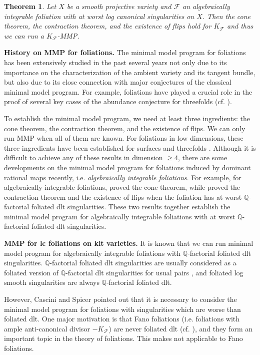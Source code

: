 \documentclass[11pt]{amsart}
\numberwithin{equation}{section}
\newcommand{\Qq}{\mathbb{Q}}
\newcommand{\Ff}{\mathcal{F}}
\newtheorem{thm}{Theorem}[section]
\theoremstyle{definition}
\theoremstyle{definition}
\theoremstyle{definition}
\begin{document}
\begin{thm}\label{thm: main theorem smooth projective}
    Let $X$ be a smooth projective variety and $\Ff$ an algebraically integrable foliation with at worst log canonical singularities on $X$. Then the cone theorem, the contraction theorem, and the existence of flips hold for $K_{\Ff}$ and thus we can run a $K_{\Ff}$-MMP.
\end{thm}

\noindent\textbf{History on MMP for foliations.} The minimal model program for foliations has been extensively studied in the past several years not only due to its importance on the characterization of the ambient variety and its tangent bundle, but also due to its close connection with major conjectures of the classical minimal model program. For example, foliations have played a crucial role in the proof of several key cases of the abundance conjecture for threefolds (cf. \cite{Miy87}).

To establish the minimal model program, we need at least three ingredients: the cone theorem, the contraction theorem, and the existence of flips. We can only run MMP when all of them are known. For foliations in low dimensions, these three ingredients have been established for surfaces \cite{McQ08,Bru15} and threefolds \cite{CS20,Spi20,CS21,SS22}. Although it is difficult to achieve any of these results in dimension $\geq 4$, there are some developments on the minimal model program for foliations induced by dominant rational maps recently, i.e. \emph{algebraically integrable foliations}. For example, for algebraically integrable foliations, \cite{ACSS21} proved the cone theorem, while \cite{CHLX23} proved the contraction theorem and the existence of flips when the foliation has at worst $\Qq$-factorial foliated dlt singularities. These two results together establish the minimal model program for algebraically integrable foliations with at worst $\Qq$-factorial foliated dlt singularities.

\medskip

\noindent\textbf{MMP for lc foliations on klt varieties.} It is known that we can run minimal model program for algebraically integrable foliations with $\Qq$-factorial foliated dlt singularities. $\Qq$-factorial foliated dlt singularities are usually considered as a foliated version of $\Qq$-factorial dlt singularities for usual pairs \cite{CS21,CHLX23}, and foliated log smooth singularities are always $\Qq$-factorial foliated dlt. 

However, Cascini and Spicer \cite{CS23a} pointed out that it is necessary to consider the minimal model program for foliations with singularities which are worse than foliated dlt. One major motivation is that Fano foliations (i.e. foliations with ample anti-canonical divisor $-K_{\Ff}$) are never foliated dlt (cf. \cite[Theorem 5.1]{AD13}), and they form an important topic in the theory of foliations. This makes \cite{CHLX23} not applicable to Fano foliations. 
\end{document}

